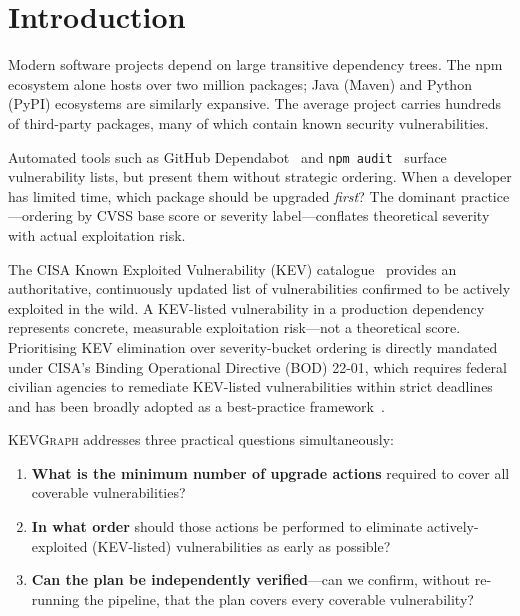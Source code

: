 \documentclass[conference]{IEEEtran}
\newcommand{\kevgraph}{\textsc{KEVGraph}\xspace}
\begin{document}
\section{Introduction}
\label{sec:intro}

Modern software projects depend on large transitive dependency trees.
The npm ecosystem alone hosts over two million packages; Java (Maven)
and Python (PyPI) ecosystems are similarly expansive.  The average
project carries hundreds of third-party packages, many of which
contain known security vulnerabilities.

Automated tools such as GitHub Dependabot~\cite{dependabot} and
\texttt{npm audit}~\cite{npm_audit} surface vulnerability lists, but
present them without strategic ordering.  When a developer has limited
time, which package should be upgraded \emph{first}?  The dominant
practice---ordering by CVSS base score or severity label---conflates
theoretical severity with actual exploitation risk.

The CISA Known Exploited Vulnerability (KEV) catalogue~\cite{cisa_kev}
provides an authoritative, continuously updated list of vulnerabilities
confirmed to be actively exploited in the wild.  A KEV-listed
vulnerability in a production dependency represents concrete,
measurable exploitation risk---not a theoretical score.  Prioritising
KEV elimination over severity-bucket ordering is directly mandated under
CISA's Binding Operational Directive (BOD) 22-01, which requires
federal civilian agencies to remediate KEV-listed vulnerabilities within
strict deadlines and has been broadly adopted as a best-practice
framework~\cite{cisa_kev}.

\kevgraph addresses three practical questions simultaneously:
\begin{enumerate}
  \item \textbf{What is the minimum number of upgrade actions} required
        to cover all coverable vulnerabilities?
  \item \textbf{In what order} should those actions be performed to
        eliminate actively-exploited (KEV-listed) vulnerabilities
        as early as possible?
  \item \textbf{Can the plan be independently verified}---can we
        confirm, without re-running the pipeline, that the plan covers
        every coverable vulnerability?
\end{enumerate}
\end{document}
